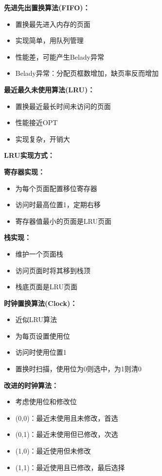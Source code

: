 \documentclass[lang=cn,newtx,10pt,scheme=chinese]{../../elegantbook}
\begin{document}
\textbf{先进先出置换算法(FIFO)：}
\begin{itemize}
  \item 置换最先进入内存的页面
  \item 实现简单，用队列管理
  \item 性能差，可能产生Belady异常
  \item Belady异常：分配页框数增加，缺页率反而增加
\end{itemize}

\textbf{最近最久未使用算法(LRU)：}
\begin{itemize}
  \item 置换最近最长时间未访问的页面
  \item 性能接近OPT
  \item 实现复杂，开销大
\end{itemize}

\textbf{LRU实现方式：}

\textbf{寄存器实现：}
\begin{itemize}
  \item 为每个页面配置移位寄存器
  \item 访问时最高位置1，定期右移
  \item 寄存器值最小的页面是LRU页面
\end{itemize}

\textbf{栈实现：}
\begin{itemize}
  \item 维护一个页面栈
  \item 访问页面时将其移到栈顶
  \item 栈底页面是LRU页面
\end{itemize}

\textbf{时钟置换算法(Clock)：}
\begin{itemize}
  \item 近似LRU算法
  \item 为每页设置使用位
  \item 访问时使用位置1
  \item 置换时扫描，使用位为0则选中，为1则清0
\end{itemize}

\textbf{改进的时钟算法：}
\begin{itemize}
  \item 考虑使用位和修改位
  \item (0,0)：最近未使用且未修改，首选
  \item (0,1)：最近未使用但已修改，次选
  \item (1,0)：最近使用但未修改
  \item (1,1)：最近使用且已修改，最后选择
\end{itemize}
\end{document}
